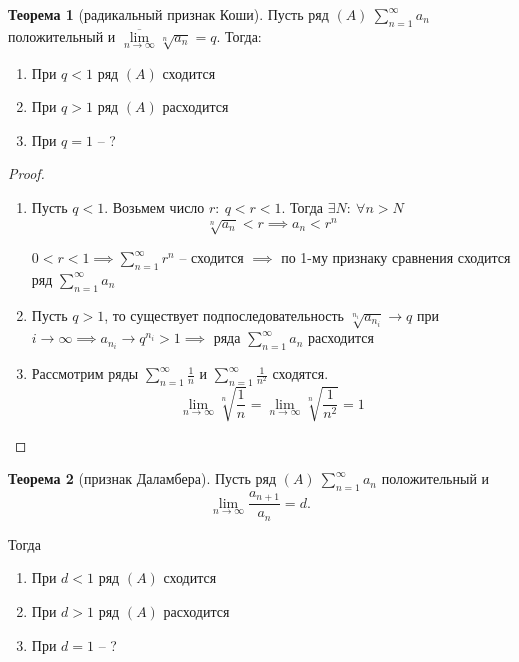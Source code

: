\documentclass{report}
\theoremstyle{definition}
\newtheorem{theorem}{Теорема}[section]
\begin{document}
\begin{theorem}[радикальный признак Коши]
  Пусть ряд $(A) \ \sum_{n=1}^{\infty}a_n$ положительный и $\underset{n\rightarrow\infty}{\overline{\lim}}\sqrt[n]{a_n} = q$. Тогда:
  \begin{enumerate}
    \item При $q < 1$ ряд $(A)$ сходится
    \item При $q > 1$ ряд $(A)$ расходится
    \item При $q = 1$ -- ?
  \end{enumerate}
\end{theorem}

\begin{proof}
  \begin{enumerate}
    \item Пусть $q < 1$. Возьмем число $r: \ q < r < 1$. Тогда $\exists N: \ \forall n > N$
          \begin{equation*}
            \sqrt[n]{a_n} < r \implies a_n < r^n
          \end{equation*}

          $0 < r < 1 \implies \sum_{n=1}^{\infty}r^n$ -- сходится $\implies$ по 1-му признаку сравнения сходится ряд $\sum_{n=1}^{\infty}a_n$

    \item Пусть $q > 1$, то существует подпоследовательность $\sqrt[n_i]{a_{n_i}} \rightarrow q$ при $i\rightarrow\infty \implies a_{n_i}\rightarrow q^{n_i} > 1 \implies$ ряда $\sum_{n=1}^{\infty}a_n$ расходится

    \item Рассмотрим ряды $\sum_{n=1}^{\infty}\frac{1}{n}$ и $\sum_{n=1}^{\infty}\frac{1}{n^2}$ сходятся.
          \begin{equation*}
            \underset{n\rightarrow\infty}{\lim}\sqrt[n]{\frac{1}{n}} = \underset{n\rightarrow\infty}{\lim}\sqrt[n]{\frac{1}{n^2}} = 1
          \end{equation*}
  \end{enumerate}
\end{proof}

\begin{theorem}[признак Даламбера]
  Пусть ряд $(A) \ \sum_{n=1}^{\infty}a_n$ положительный и
  \begin{equation*}
    \underset{n\rightarrow\infty}{\lim}\frac{a_{n+1}}{a_n} = d.
  \end{equation*}

  Тогда
  \begin{enumerate}
    \item При $d < 1$ ряд $(A)$ сходится
    \item При $d > 1$ ряд $(A)$ расходится
    \item При $d = 1$ -- ?
  \end{enumerate}
\end{theorem}
\end{document}
